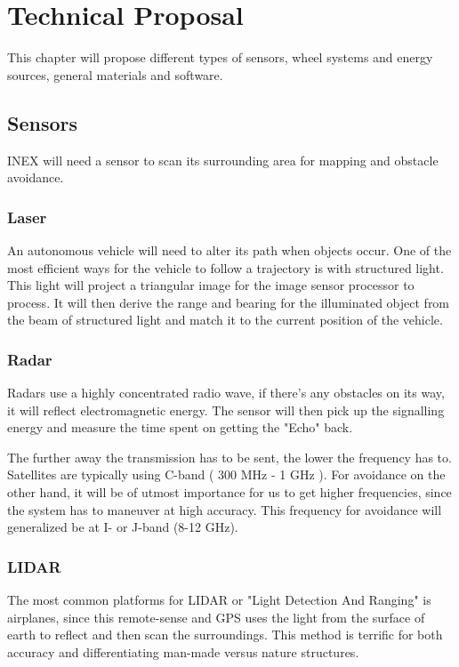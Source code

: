 \chapter{Technical Proposal}\label{ch:solutionProposal}
This chapter will propose different types of sensors, wheel systems and energy sources, general materials and software.

\section{Sensors}
INEX will need a sensor to scan its surrounding area for mapping and obstacle avoidance.

\subsection{Laser}
An autonomous vehicle will need to alter its path when objects occur. One of the most efficient ways for the vehicle to follow a trajectory is with structured light.\\This light will project a triangular image for the image sensor processor to process. It will then derive the range and bearing for the illuminated object from the beam of  structured light and match it to the current position of the vehicle\cite{Lasers}.


\subsection{Radar}
Radars use a highly concentrated radio wave, if there's any obstacles on its way, it will reflect electromagnetic energy. The sensor will then pick up the signalling energy and measure the time spent on getting the "Echo" back\cite{Radar}.

The further away the transmission has to be sent, the lower the frequency has to.
Satellites are typically using C-band ( 300 MHz - 1 GHz ). 
For avoidance on the other hand, it will be of utmost importance for us to get higher frequencies, since the system has to maneuver at high accuracy. This frequency for avoidance will generalized be at I- or J-band (8-12 GHz)\cite{RadarTutorial}.



\subsection{LIDAR}
The most common platforms for LIDAR or "Light Detection And Ranging" is airplanes,
since this remote-sense and GPS uses the light from the surface of earth to
reflect and then scan the surroundings. This method is terrific for both accuracy
and differentiating man-made versus nature structures\cite{LIDAR}.

